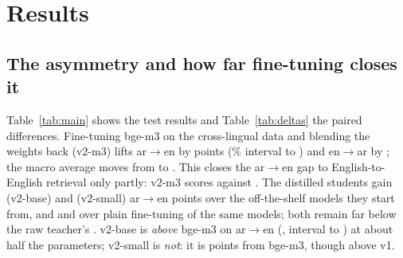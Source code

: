 \documentclass[11pt]{article}
\newcommand{\tabfont}{\footnotesize\setlength{\tabcolsep}{3.2pt}}
\newcommand{\ardir}{ar$\to$en}
\newcommand{\eadir}{en$\to$ar}
\begin{document}
\section{Results}
\begin{table}[t]
\centering\tabfont

\caption{Test MRR@10 $\times100$ per direction. Models are grouped by size (118M, 278M, 568M). Bold: best of the column.
v1 is seed 13 (the three-seed mean of v1 is \NumVOneSeedArEn{} on \ardir{}); ``no KD'' rows are plain fine-tunes on the same data, one epoch; v2-base and v2-small are three-seed soups; v2-m3 is the WiSE blend, the raw fine-tune its $\alpha=1$ end.}\label{tab:main}
\end{table}

\subsection{The asymmetry and how far fine-tuning closes it}
Table~\ref{tab:main} shows the test results and Table~\ref{tab:deltas} the paired differences.
Fine-tuning bge-m3 on the cross-lingual data and blending the weights back (v2-m3) lifts \ardir{} by \NumDeltaVTwoMVsBgeArEn{} points (\NumCiLevel\% interval \NumDeltaVTwoMVsBgeArEnLo{} to \NumDeltaVTwoMVsBgeArEnHi) and \eadir{} by \NumGainEnAr{}; the macro average moves from \NumBgeMacro{} to \NumVTwoMMacro{}.
This closes the \ardir{} gap to English-to-English retrieval only partly: v2-m3 scores \NumVTwoMArEn{} against \NumVTwoMEnEn{}.
The distilled students gain \NumDeltaVTwoBVsEBaseArEn{} (v2-base) and \NumDeltaVTwoSVsESmallArEn{} (v2-small) \ardir{} points over the off-the-shelf models they start from, and \NumDeltaDistBaseArEn{} and \NumDeltaDistSmallArEn{} over plain fine-tuning of the same models; both remain far below the raw teacher's \NumVTwoMRawArEn{}.
v2-base is \emph{above} bge-m3 on \ardir{} (\NumDeltaVTwoBVsBgeArEn{}, interval \NumDeltaVTwoBVsBgeArEnLo{} to \NumDeltaVTwoBVsBgeArEnHi) at about half the parameters; v2-small is \emph{not}: it is \NumDeltaVTwoSVsBgeArEn{} points from bge-m3, though \NumDeltaVTwoSVsVOneArEn{} above v1.

\begin{table}[t]
\centering\tabfont
{}
\caption{Paired differences on the test split (percentage points).}\label{tab:deltas}
\end{table}
\end{document}
